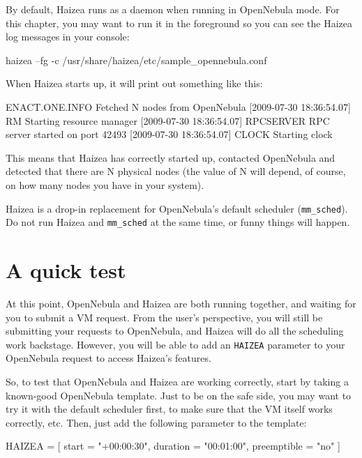 By default, Haizea runs as a daemon when running in OpenNebula mode. For this chapter, you may want to run it in the foreground so you can see the Haizea log messages in your console:

\begin{wideshellverbatim}
haizea --fg -c /usr/share/haizea/etc/sample_opennebula.conf
\end{wideshellverbatim}

When Haizea starts up, it will print out something like this:

\begin{wideshellverbatim}
[                      ] ENACT.ONE.INFO Fetched N nodes from OpenNebula
[2009-07-30 18:36:54.07] RM      Starting resource manager
[2009-07-30 18:36:54.07] RPCSERVER RPC server started on port 42493
[2009-07-30 18:36:54.07] CLOCK   Starting clock
\end{wideshellverbatim}

This means that Haizea has correctly started up, contacted OpenNebula and detected that there are N physical nodes (the value of N will depend, of course, on how many nodes you have in your system).

\begin{warning}
Haizea is a drop-in replacement for OpenNebula's default scheduler (\texttt{mm\_sched}). Do not run Haizea and \texttt{mm\_sched} at the same time, or funny things will happen.
\end{warning}

\section{A quick test}

At this point, OpenNebula and Haizea are both running together, and waiting for you to submit a VM request. From the user's perspective, you will still be submitting your requests to OpenNebula, and Haizea will do all the scheduling work backstage. However, you will be able to add an \texttt{HAIZEA} parameter to your OpenNebula request to access Haizea's features.

So, to test that OpenNebula and Haizea are working correctly, start by taking a known-good OpenNebula template. Just to be on the safe side, you may want to try it with the default scheduler first, to make sure that the VM itself works correctly, etc. Then, just add the following parameter to the template:

\begin{wideshellverbatim}
HAIZEA = [
  start        = "+00:00:30",
  duration     = "00:01:00",
  preemptible  = "no"
]
\end{wideshellverbatim}

